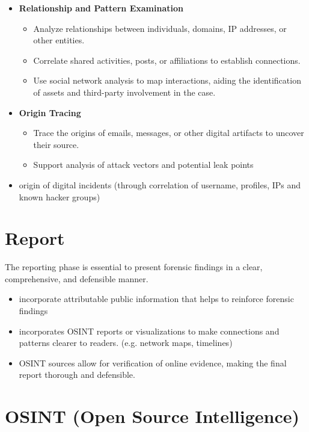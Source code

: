 \begin{itemize}
\item \textbf{Relationship and Pattern Examination}
    \begin{itemize}
        \item Analyze relationships between individuals, domains, IP addresses, or other entities.
        \item Correlate shared activities, posts, or affiliations to establish connections.
        \item Use social network analysis to map interactions, aiding the identification of assets and third-party involvement in the case.
    \end{itemize}

\item \textbf{Origin Tracing}
    \begin{itemize}
        \item Trace the origins of emails, messages, or other digital artifacts to uncover their source.
        \item Support analysis of attack vectors and potential leak points
    \end{itemize}

\item origin of digital incidents (through correlation of username, profiles, IPs and known hacker groups)
\end{itemize}

\section{Report}
The reporting phase is essential to present forensic findings in a clear, comprehensive, and defensible manner.

\begin{itemize}
    \item incorporate attributable public information that helps to reinforce forensic findings
    \item  incorporates OSINT reports or visualizations to make connections and patterns clearer to readers. (e.g. network maps, timelines)
    \item  OSINT sources allow for verification of online evidence, making the final report thorough and defensible.
\end{itemize}

\section{OSINT (Open Source Intelligence)}
